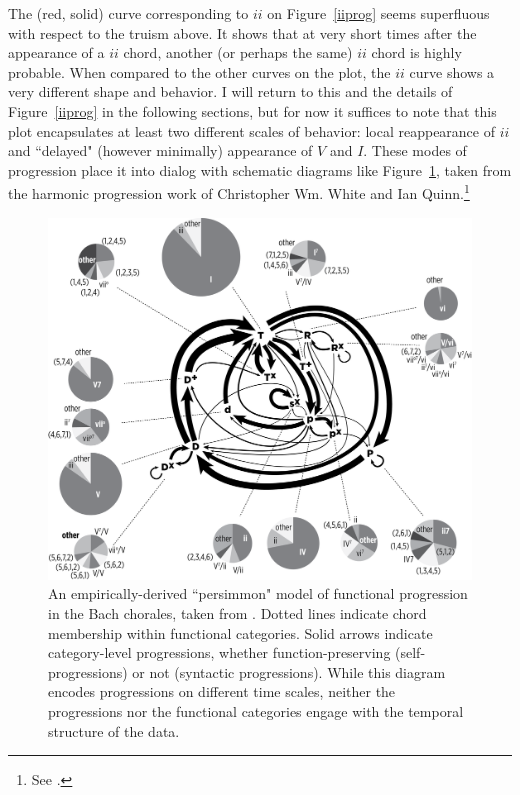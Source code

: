 The (red, solid) curve corresponding to $ii$ on Figure~\ref{iiprog} seems superfluous with respect to the truism above.  It shows that at very short times after the appearance of a $ii$ chord, another (or perhaps the same) $ii$ chord is highly probable.  When compared to the other curves on the plot, the $ii$ curve shows a very different shape and behavior.  I will return to this and the details of Figure~\ref{iiprog} in the following sections, but for now it suffices to note that this plot encapsulates at least two different scales of behavior: local reappearance of $ii$ and ``delayed" (however minimally) appearance of $V$ and $I$.  These modes of progression place it into dialog with schematic diagrams like Figure~\ref{pers}, taken from the harmonic progression work of Christopher Wm. White and Ian Quinn.\footnote{See \cite{wq2017}.}

\begin{figure}
	\centering
	\includegraphics[width=5.5in]{WhiteQuinn_NewPersimmon.png}
	\caption{An empirically-derived ``persimmon" model of functional progression in the Bach chorales, taken from \cite{wq2017}.  Dotted lines indicate chord membership within functional categories.  Solid arrows indicate category-level progressions, whether function-preserving (self-progressions) or not (syntactic progressions).  While this diagram encodes progressions on different time scales, neither the progressions nor the functional categories engage with the temporal structure of the data.}
	\label{pers}
\end{figure}

